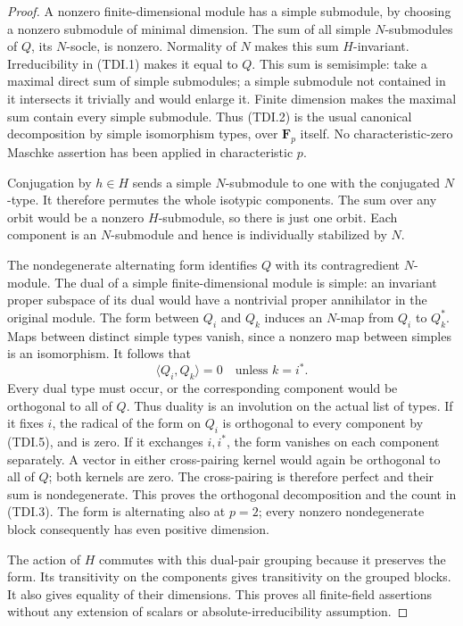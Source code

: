 \begin{proof}
A nonzero finite-dimensional module has a simple submodule, by
choosing a nonzero submodule of minimal dimension. The sum of all
simple \(N\)-submodules of \(Q\), its \(N\)-socle, is nonzero.
Normality of \(N\) makes this sum \(H\)-invariant. Irreducibility
in (TDI.1) makes it equal to \(Q\).
This sum is semisimple: take a maximal direct sum of simple
submodules; a simple submodule not contained in it intersects
it trivially and would enlarge it. Finite dimension makes the
maximal sum contain every simple submodule. Thus (TDI.2) is the
usual canonical decomposition by simple isomorphism types, over
\(\mathbf F_p\) itself. No characteristic-zero Maschke assertion
has been applied in characteristic \(p\).

Conjugation by \(h\in H\) sends a simple \(N\)-submodule to one
with the conjugated \(N\)-type. It therefore permutes the whole
isotypic components. The sum over any orbit would be a nonzero
\(H\)-submodule, so there is just one orbit. Each component is
an \(N\)-submodule and hence is individually stabilized by \(N\).

The nondegenerate alternating form identifies \(Q\) with its
contragredient \(N\)-module. The dual of a simple finite-dimensional
module is simple: an invariant proper subspace of its dual would
have a nontrivial proper annihilator in the original module.
The form between \(Q_i\) and \(Q_k\) induces an \(N\)-map
from \(Q_i\) to \(Q_k^*\). Maps between distinct simple types
vanish, since a nonzero map between simples is an isomorphism.
It follows that
\[
                 \langle Q_i,Q_k\rangle=0
                         \quad\text{unless }k=i^*.
 \tag{TDI.5}
\]
Every dual type must occur, or the corresponding component would
be orthogonal to all of \(Q\). Thus duality is an involution on
the actual list of types. If it fixes \(i\), the radical of the
form on \(Q_i\) is orthogonal to every component by (TDI.5),
and is zero. If it exchanges \(i,i^*\), the form vanishes on
each component separately. A vector in either cross-pairing kernel
would again be orthogonal to all of \(Q\); both kernels are zero.
The cross-pairing is therefore perfect and their sum is nondegenerate.
This proves the orthogonal decomposition and the count in (TDI.3).
The form is alternating also at \(p=2\); every nonzero nondegenerate
block consequently has even positive dimension.

The action of \(H\) commutes with this dual-pair grouping because
it preserves the form. Its transitivity on the components gives
transitivity on the grouped blocks. It also gives equality of their
dimensions. This proves all finite-field assertions without any
extension of scalars or absolute-irreducibility assumption.


\end{proof}
